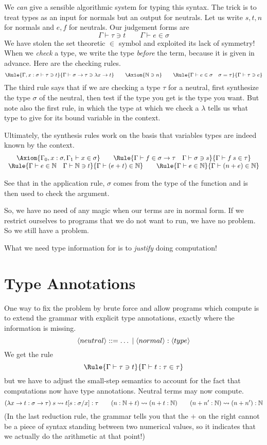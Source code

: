 \documentclass{article}
\begin{document}
We \emph{can} give a sensible algorithmic system for typing this syntax.
The trick is to treat types as an input for normals but an output for neutrals.
Let us write $s,t,n$ for normals and $e,f$ for neutrals. Our judgement forms are
\[
  \Gamma \vdash \tau \ni t \qquad \Gamma \vdash e\in\sigma
\]
We have stolen the set theoretic $\in$ symbol and exploited its lack of
symmetry! When we \emph{check} a type, we write the type \emph{before} the
term, because it is given in advance. Here are the checking rules.
\[
  \Rule{\Gamma,x:\sigma \vdash \tau \ni t}
  {\Gamma\vdash \sigma\to\tau \ni \lambda x\to t}
  \qquad
  \Axiom{\Nat\ni n}
  \qquad
  \Rule{\Gamma\vdash e\in\sigma\quad \sigma = \tau}
       {\Gamma\vdash \tau \ni e}
  \]
The third rule says that if we are checking a type $\tau$ for a neutral,
first synthesize the type $\sigma$ of the neutral, then test if the type you
get is the type you want. But note also the first rule, in which the type
at which we check a $\lambda$ tells us what type to give for its bound
variable in the context.

Ultimately, the synthesis rules work on the basis that variables types are indeed
known by the context.
\[\begin{array}{c}
  \Axiom{\Gamma_0,x:\sigma,\Gamma_1\vdash x\in\sigma} \qquad
  \Rule{\Gamma\vdash f\in \sigma\to\tau \quad \Gamma\vdash \sigma\ni s}
    {\Gamma\vdash f\:s\in \tau}
    \\
  \Rule{\Gamma\vdash e\in\Nat\quad \Gamma\vdash \Nat\ni t}
  {\Gamma\vdash (e + t) \in \Nat} \qquad
  \Rule{\Gamma\vdash e\in\Nat}
    {\Gamma\vdash (n+e)\in\Nat}
\end{array}  \]

See that in the application rule, $\sigma$ comes from the type of the
function and is then used to check the argument.

So, we have no need of any magic when our terms are in normal form. If we
restrict ourselves to programs that we do not want to run, we have no
problem. So we still have a problem.

What we need type information for is to \emph{justify} doing computation!


\section{Type Annotations}

One way to fix the problem by brute force and allow programs which compute
is to extend the grammar with explicit type annotations, exactly where the
information is missing.
\[
  \langle neutral \rangle ::= \ldots \;|\; \langle normal \rangle:\langle type \rangle
\]
We get the rule
\[
  \Rule{\Gamma\vdash \tau\ni t}
    {\Gamma\vdash t:\tau \in \tau}
\]
but we have to adjust the small-step semantics to account for the fact that
computations now have type annotations. Neutral terms may now compute.
\[
  (\lambda x\to t : \sigma\to\tau)\;s \leadsto
  t[s:\sigma/x]:\tau \qquad
  (n:\mathbb{N} + t) \leadsto (n + t:\mathbb{N}) \qquad
  (n + n':\mathbb{N}) \leadsto (n + n'):\mathbb{N}
\]
(In the last reduction rule, the grammar tells you that the $+$ on the right
cannot be a piece of syntax standing between two numerical values, so it
indicates that we actually do the arithmetic at that point!)
\end{document}
